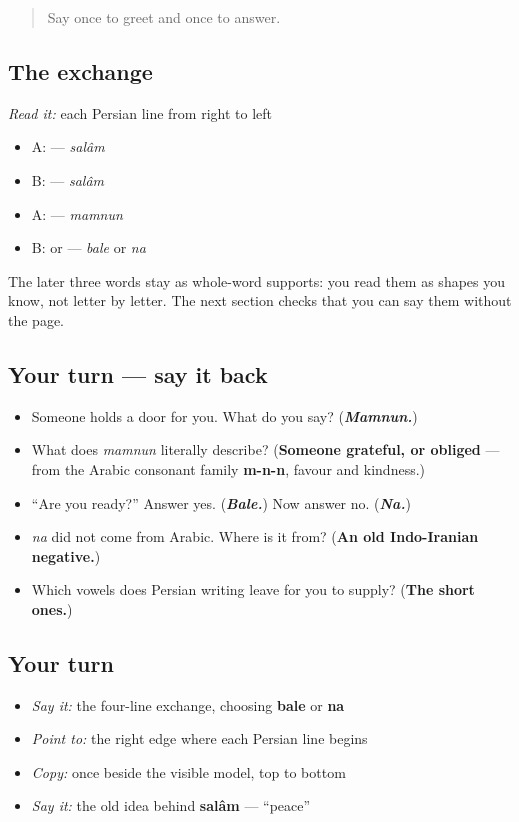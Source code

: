 \label{lesson:FA-C01-practice}



\begin{quote}
Say \textbf{} once to greet and once to answer.
\end{quote}

\subsection*{The exchange}
\emph{Read it:} each Persian line from right to left

\begin{itemize}
\raggedright
  \item A: \textbf{} — \emph{salâm}
  \item B: \textbf{} — \emph{salâm}
  \item A: \textbf{} — \emph{mamnun}
  \item B: \textbf{} or \textbf{} — \emph{bale} or \emph{na}
\end{itemize}

The later three words stay as whole-word supports: you read them as shapes you know, not letter by letter. The next section checks that you can say them without the page.

\subsection*{Your turn — say it back}
\begin{itemize}
\raggedright
  \item Someone holds a door for you. What do you say? (\emph{\textbf{Mamnun.}})
  \item What does \emph{mamnun} literally describe? (\textbf{Someone grateful, or obliged} — from the Arabic consonant family \textbf{m-n-n}, favour and kindness.)
  \item \textquotedblleft{}Are you ready?\textquotedblright{} Answer yes. (\emph{\textbf{Bale.}}) Now answer no. (\emph{\textbf{Na.}})
  \item \emph{na} did not come from Arabic. Where is it from? (\textbf{An old Indo-Iranian negative.})
  \item Which vowels does Persian writing leave for you to supply? (\textbf{The short ones.})
\end{itemize}

\subsection*{Your turn}
\begin{itemize}
\raggedright
  \item \emph{Say it:} the four-line exchange, choosing \textbf{bale} or \textbf{na}
  \item \emph{Point to:} the right edge where each Persian line begins
  \item \emph{Copy:} \textbf{} once beside the visible model, top to bottom
  \item \emph{Say it:} the old idea behind \textbf{salâm} — \textquotedblleft{}peace\textquotedblright{}
\end{itemize}

